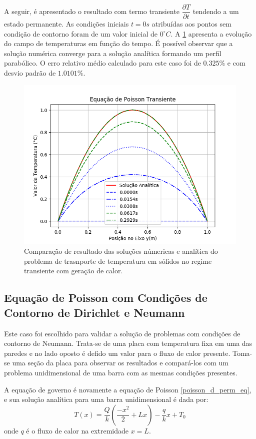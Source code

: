 A seguir, é apresentado o resultado com termo transiente $\dfrac{\partial T}{\partial t}$ tendendo a um estado permanente.
As condições iniciais $t=0s$ atribuídas aos pontos sem condição de contorno foram de um valor inicial de $0^{\circ}C$.
A \ref{poisson_d_trans_comp} apresenta a evolução do campo de temperaturas em função do tempo.
É possível observar que a solução numérica converge para a solução analítica formando um perfil parabólico.
O erro relativo médio calculado para este caso foi de $0.325\%$ e com desvio padrão de $1.0101\%$.
\begin{figure}[H]
    \centering
    \includegraphics[width=.7\linewidth]{figures/poisson_dirichlet_transient_comparison.png}
    \caption{Comparação de resultado das soluções númericas e analítica do problema de trasnporte de temperatura em sólidos no regime transiente com geração de calor.}
    \label{poisson_d_trans_comp}
\end{figure}

\subsection{\textbf{Equação de Poisson com Condições de Contorno de Dirichlet e Neumann}}
\label{sec_poisson_neu}
Este caso foi escolhido para validar a solução de problemas com condições de contorno de Neumann.
Trata-se de uma placa com temperatura fixa em uma das paredes e no lado oposto é defido um valor para o fluxo de calor presente.
Toma-se uma seção da placa para observar os resultados e compará-los com um problema unidimensional de uma barra com as mesmas condições presentes.

A equação de governo é novamente a equação de Poisson \eqref{poisson_d_perm_eq}, e sua solução analítica para uma barra unidimensional é dada por:
\begin{equation}
    T(x) = \dfrac{Q}{k}\left(\dfrac{-x^2}{2} + L x\right) - \dfrac{q}{k} x + T_0
    \label{poisson_n_sol} 
\end{equation}
onde $q$ é o fluxo de calor na extremidade $x=L$.

